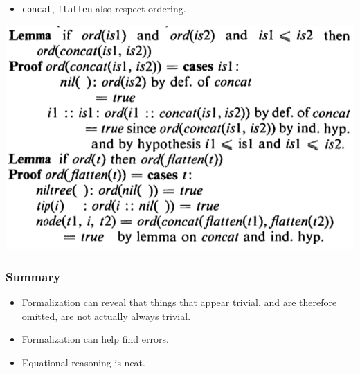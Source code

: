 \documentclass{beamer}
\newcommand{\code}[1]{\texttt{#1}}
\begin{document}
\begin{frame}
  \begin{itemize}
  \item \code{concat}, \code{flatten} also respect ordering.
  \end{itemize}
  {\center\includegraphics[width=.5\textwidth]{./ord-concat.png}\\}
\end{frame}

\begin{frame}
  \frametitle{Summary}
  \begin{itemize}
  \item Formalization can reveal that things that appear trivial, and are
    therefore omitted, are not actually always trivial.
  \item Formalization can help find errors.
  \item Equational reasoning is neat.
  \end{itemize}
\end{frame}
\end{document}
